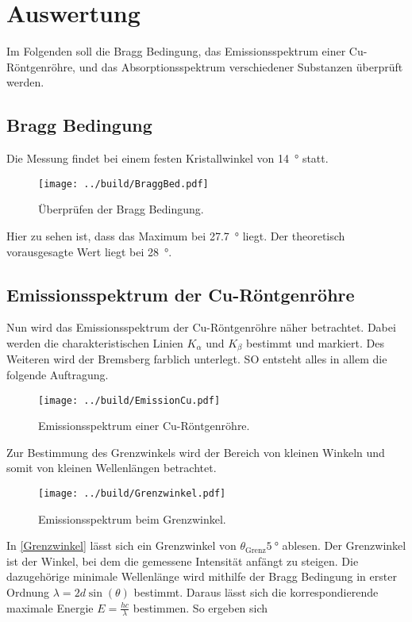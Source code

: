 


\section{Auswertung}
\label{sec:Auswertung}

Im Folgenden soll die Bragg Bedingung, das Emissionsspektrum einer Cu-Röntgenröhre, und das Absorptionsspektrum verschiedener Substanzen überprüft 
werden. 

\subsection{Bragg Bedingung}
Die Messung findet bei einem festen Kristallwinkel von \qty{14}{\degree} statt.

\begin{figure}[H]
    \centering
    \texttt{[image: ../build/BraggBed.pdf]}
    \caption{Überprüfen der Bragg Bedingung.}
\end{figure}    

\noindent Hier zu sehen ist, dass das Maximum bei \qty{27.7}{\degree} liegt. Der theoretisch vorausgesagte Wert liegt bei \qty{28}{\degree}.  
    
\subsection{Emissionsspektrum der Cu-Röntgenröhre}
Nun wird das Emissionsspektrum der Cu-Röntgenröhre näher betrachtet. Dabei werden die charakteristischen Linien $K_\alpha$ und $K_\beta$ bestimmt 
und markiert. Des Weiteren wird der Bremsberg farblich unterlegt. SO entsteht alles in allem die folgende Auftragung. 

\begin{figure}[H]
    \centering
    \texttt{[image: ../build/EmissionCu.pdf]}
    \caption{Emissionsspektrum einer Cu-Röntgenröhre.}
\end{figure}    

\noindent Zur Bestimmung des Grenzwinkels wird der Bereich von kleinen Winkeln und somit von kleinen Wellenlängen betrachtet. 

\begin{figure}[H]
    \centering
    \texttt{[image: ../build/Grenzwinkel.pdf]}
    \caption{Emissionsspektrum beim Grenzwinkel.}
    \label{Grenzwinkel}
\end{figure}    

\noindent In \autoref{Grenzwinkel} lässt sich ein Grenzwinkel von $\theta_\text{Grenz} \qty{5}{\degree}$ ablesen. Der Grenzwinkel ist der Winkel, 
bei dem die gemessene Intensität anfängt zu steigen. Die dazugehörige minimale 
Wellenlänge wird mithilfe der Bragg Bedingung in erster Ordnung $\lambda=2 d \sin(\theta)$ bestimmt. Daraus lässt sich die korrespondierende maximale 
Energie $E=\frac{hc}{\lambda}$ bestimmen. So ergeben sich 

